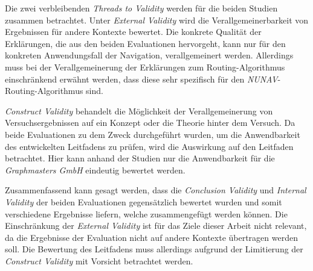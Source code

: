 Die zwei verbleibenden \textit{Threads to Validity} werden für die beiden Studien zusammen betrachtet. Unter \textit{External Validity} wird die Verallgemeinerbarkeit von Ergebnissen für andere Kontexte bewertet. Die konkrete Qualität der Erklärungen, die aus den beiden Evaluationen hervorgeht, kann nur für den konkreten Anwendungsfall der Navigation, verallgemeinert werden. Allerdings muss bei der Verallgemeinerung der Erklärungen zum Routing-Algorithmus einschränkend erwähnt werden, dass diese sehr spezifisch für den \textit{NUNAV}-Routing-Algorithmus sind.

\textit{Construct Validity} behandelt die Möglichkeit der Verallgemeinerung von Versuchsergebnissen auf ein Konzept oder die Theorie hinter dem Versuch. Da beide Evaluationen zu dem Zweck durchgeführt wurden, um die Anwendbarkeit des entwickelten Leitfadens zu prüfen, wird die Auswirkung auf den Leitfaden betrachtet. Hier kann anhand der Studien nur die Anwendbarkeit für die \textit{Graphmasters GmbH} eindeutig bewertet werden. 

\smallskip

Zusammenfassend kann gesagt werden, dass die \textit{Conclusion Validity} und \textit{Internal Validity} der beiden Evaluationen gegensätzlich bewertet wurden und somit verschiedene Ergebnisse liefern, welche zusammengefügt werden können. Die Einschränkung der \textit{External Validity} ist für das Ziele dieser Arbeit nicht relevant, da die Ergebnisse der Evaluation nicht auf andere Kontexte übertragen werden soll. Die Bewertung des Leitfadens muss allerdings aufgrund der Limitierung der \textit{Construct Validity} mit Vorsicht betrachtet werden.
